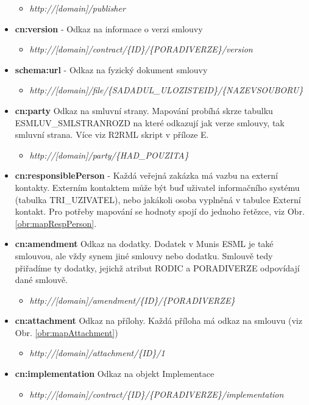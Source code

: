 \begin{itemize}
	\begin{itemize}
	\item \textit{http://[domain]/publisher}
	\end{itemize}
\item \textbf{cn:version} - Odkaz na informace o verzi smlouvy
	\begin{itemize}
	\item \textit{http://[domain]/contract/\{ID\}/\{PORADIVERZE\}/version}
	\end{itemize}
\item \textbf{schema:url} - Odkaz na fyzický dokument smlouvy
	\begin{itemize}
	\item \textit{http://[domain]/file/\{SADADUL\_ULOZISTEID\}/\{NAZEVSOUBORU\}}
	\end{itemize}
\item \textbf{cn:party} Odkaz na smluvní strany. Mapování probíhá skrze tabulku \\ESMLUV\_SMLSTRANROZD na které odkazují jak verze smlouvy, tak smluvní strana. Více viz R2RML skript v příloze E.
	\begin{itemize}
	\item \textit{http://[domain]/party/\{HAD\_POUZITA\}}
	\end{itemize}
\item \textbf{cn:responsiblePerson} - Každá veřejná zakázka má vazbu na externí kontakty. Externím kontaktem může být buď uživatel informačního systému (tabulka TRI\_UZIVATEL), nebo jakákoli osoba vyplněná v tabulce Externí kontakt. Pro potřeby mapování se hodnoty spojí do jednoho řetězce, viz Obr. \ref{obr:mapRespPerson}.	
\item \textbf{cn:amendment} Odkaz na dodatky. Dodatek v Munis ESML je také smlouvou, ale vždy synem jiné smlouvy nebo dodatku. Smlouvě tedy přiřadíme ty dodatky, jejichž atribut RODIC a PORADIVERZE odpovídají dané smlouvě.
	\begin{itemize}
	\item \textit{http://[domain]/amendment/\{ID\}/\{PORADIVERZE\}}
	\end{itemize}
\item \textbf{cn:attachment} Odkaz na přílohy. Každá příloha má odkaz na smlouvu (viz Obr. \ref{obr:mapAttachment})
	\begin{itemize}
	\item \textit{http://[domain]/attachment/\{ID\}/1}
	\end{itemize}
\item \textbf{cn:implementation} Odkaz na objekt Implementace
	\begin{itemize}
	\item \textit{http://[domain]/contract/\{ID\}/\{PORADIVERZE\}/implementation}
	\end{itemize}
\end{itemize}

